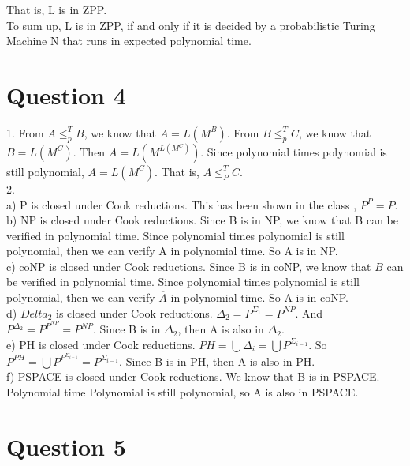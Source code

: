 \documentclass[12pt]{article}
\begin{document}
That is, L is in ZPP. \\

To sum up, L is in ZPP, if and only if it is decided by a
probabilistic Turing Machine N that runs in expected polynomial time.

\section*{Question 4}

1. From $A \le^T_p B$, we know that $A = L(M^B)$. From $B \le^T_p C$,
we know that $B = L(M^C)$. Then $A = L(M^{L(M^C)})$. Since polynomial
times polynomial is still polynomial, $A = L(M^C)$. That is, $A
\le^T_P C$. \\

2. \\

a) P is closed under Cook reductions. This has been shown in the class
, $P^P = P$. \\

b) NP is closed under Cook reductions. Since B is in NP, we know that
B can be verified in polynomial time. Since polynomial times
polynomial is still polynomial, then we can verify A in polynomial
time. So A is in NP.\\

c) coNP is closed under Cook reductions. Since B is in coNP, we know
that $\overline {B}$ can be verified in polynomial time. Since
polynomial times polynomial is still polynomial, then we can verify
$\overline {A}$ in polynomial time. So A is in coNP. \\

d) $Delta_2$ is closed under Cook reductions. $\Delta_2 =
P^{\Sigma_1} = P^{NP}$. And $P^{\Delta_2} = P^{P^{NP}} = P^{NP}$. Since
B is in $\Delta_2$, then A is also in $\Delta_2$. \\

e) PH is closed under Cook reductions. $PH = \bigcup \Delta_i =
\bigcup P^{\Sigma_{i-1}}$. So $P^{PH} = \bigcup P^{P^{\Sigma_{i-1}}} =
P^{\Sigma_{i-1}}$. Since B is in PH, then A is also in PH. \\

f) PSPACE is closed under Cook reductions. We know that B is in
PSPACE. Polynomial time Polynomial is still polynomial, so A is also
in PSPACE.

\section*{Question 5}
\end{document}
